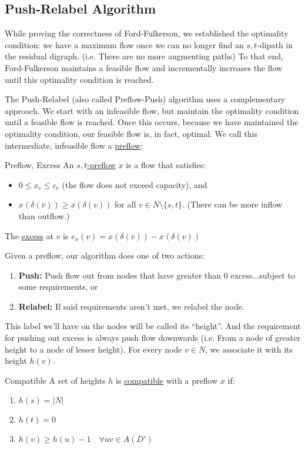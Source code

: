 \subsection{Push-Relabel Algorithm}
While proving the correctness of Ford-Fulkerson, we established the optimality condition: we have a maximum flow once we can no longer find an $s,t$-dipath in the residual digraph. (i.e. There are no more augmenting paths)
To that end, Ford-Fulkerson maintains a feasible flow and incrementally increases the flow until this optimality condition is reached.

The Push-Relabel (also called Preflow-Push) algorithm uses a complementary approach.
We start with an infeasible flow, but maintain the optimality condition until a feasible flow is reached.
Once this occurs, because we have maintained the optimality condition, our feasible flow is, in fact, optimal.
We call this intermediate, infeasible flow a \underline{preflow}:
\begin{definition}{Preflow, Excess}{}
    An \underline{$s,t$-preflow} $x$ is a flow that satisfies:
    \begin{itemize}
        \item $0 \leq x_e \leq c_e$ (the flow does not exceed capacity), and 
        \item $x(\delta(\overline{v})) \geq x(\delta(v))$ for all $v \in N \setminus \{s,t\}$. (There can be more inflow than outflow.)
    \end{itemize}

    The \underline{excess} at $v$ is $e_x(v) = x(\delta(\overline{v})) - x(\delta(v))$
\end{definition}
Given a preflow, our algorithm does one of two actions:
\begin{enumerate}
    \item \textbf{Push:} Push flow out from nodes that have greater than $0$ excess...subject to some requirements, or
    \item \textbf{Relabel:} If said requirements aren't met, we relabel the node.
\end{enumerate}
This label we'll have on the nodes will be called its ``height''.
And the requirement for pushing out excess is always push flow downwards (i.e. From a node of greater height to a node of lesser height).
For every node $v \in N$, we associate it with its height $h(v)$.
\begin{definition}{Compatible}{}
    A set of heights $h$ is \underline{compatible} with a preflow $x$ if:
    \begin{enumerate}[label=(\alph*)]
        \item $h(s) = |N|$
        \item $h(t) = 0$
        \item $h(v) \geq h(u) - 1 \quad \forall uv \in A(D')$
    \end{enumerate}
\end{definition}
